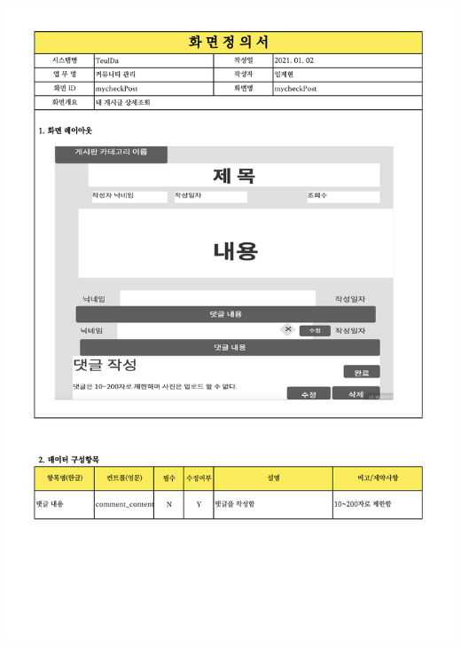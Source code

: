 {{{{{{{{{{{{{{{{{{{{{{{{{{{{{{{{{{{{{{{{{{{{{{{{{{{{\includegraphics[width=20cm]{./Figure/Analysis/Display/community/community_11.pdf} \\
}}}}}}}}}}}}}}}}}}}}}}}}}}}}}}}}}}}}}}}}}}}}}}}}}}}}
